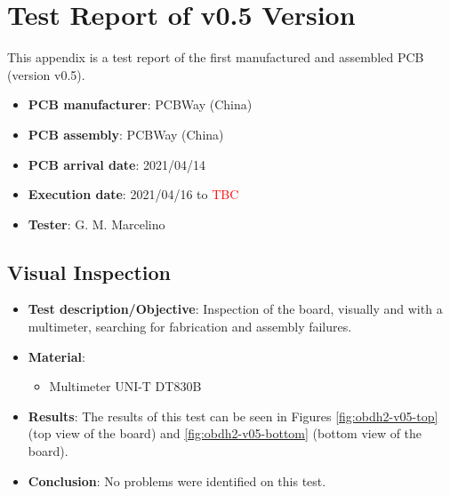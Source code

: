 %
%
%
%
%

%
%
%
%
%
%

\chapter{Test Report of v0.5 Version} \label{anx:test-report-v05}

This appendix is a test report of the first manufactured and assembled PCB (version v0.5).

\begin{itemize}
    \item \textbf{PCB manufacturer}: PCBWay (China)
    \item \textbf{PCB assembly}: PCBWay (China)
    \item \textbf{PCB arrival date}: 2021/04/14
    \item \textbf{Execution date}: 2021/04/16 to \textcolor{red}{TBC}
    \item \textbf{Tester}: G. M. Marcelino
\end{itemize}

\section{Visual Inspection}

\begin{itemize}
    \item \textbf{Test description/Objective}: Inspection of the board, visually and with a multimeter, searching for fabrication and assembly failures.
    \item \textbf{Material}:
        \begin{itemize}
            \item Multimeter UNI-T DT830B
        \end{itemize}
    \item \textbf{Results}: The results of this test can be seen in Figures \ref{fig:obdh2-v05-top} (top view of the board) and \ref{fig:obdh2-v05-bottom} (bottom view of the board).
    \item \textbf{Conclusion}: No problems were identified on this test.
\end{itemize}

